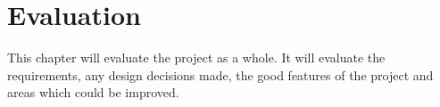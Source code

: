 \chapter{Evaluation}






This chapter will evaluate the project as a whole. It will evaluate the requirements, any design decisions made, the good features of the project and areas which could be improved.

